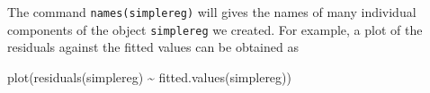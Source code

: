 \documentclass[
  letterpaper,
  DIV=11,
  numbers=noendperiod]{scrreprt}
\newenvironment{Shaded}{\begin{snugshade}}{\end{snugshade}}
\newcommand{\FunctionTok}[1]{\textcolor[rgb]{0.28,0.35,0.67}{#1}}
\newcommand{\NormalTok}[1]{\textcolor[rgb]{0.00,0.23,0.31}{#1}}
\newcommand{\SpecialCharTok}[1]{\textcolor[rgb]{0.37,0.37,0.37}{#1}}
\begin{document}
The command \texttt{names(simplereg)} will gives the names of many
individual components of the object \texttt{simplereg} we created. For
example, a plot of the residuals against the fitted values can be
obtained as

\begin{Shaded}
\begin{Highlighting}[]
\FunctionTok{plot}\NormalTok{(}\FunctionTok{residuals}\NormalTok{(simplereg) }\SpecialCharTok{\textasciitilde{}} \FunctionTok{fitted.values}\NormalTok{(simplereg))}
\end{Highlighting}
\end{Shaded}



\printbibliography
\end{document}
